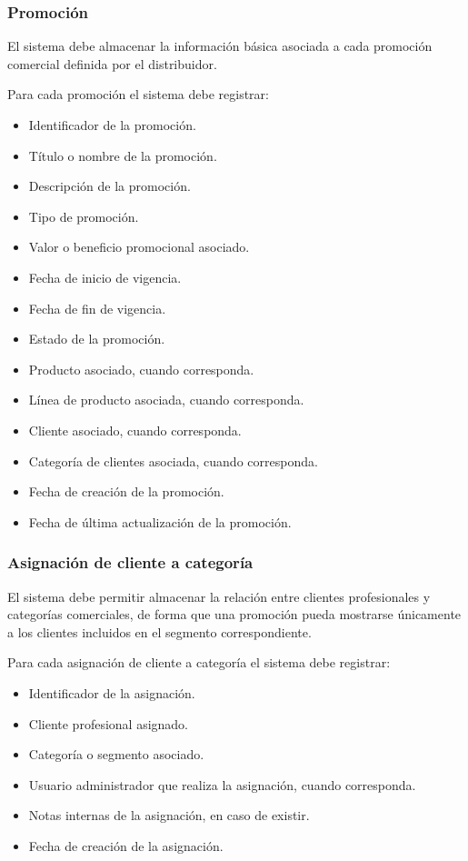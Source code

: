 \subsubsection*{Promoción}

El sistema debe almacenar la información básica asociada a cada promoción comercial definida por el distribuidor.

Para cada promoción el sistema debe registrar:

\begin{itemize}
    \item Identificador de la promoción.
    \item Título o nombre de la promoción.
    \item Descripción de la promoción.
    \item Tipo de promoción.
    \item Valor o beneficio promocional asociado.
    \item Fecha de inicio de vigencia.
    \item Fecha de fin de vigencia.
    \item Estado de la promoción.
    \item Producto asociado, cuando corresponda.
    \item Línea de producto asociada, cuando corresponda.
    \item Cliente asociado, cuando corresponda.
    \item Categoría de clientes asociada, cuando corresponda.
    \item Fecha de creación de la promoción.
    \item Fecha de última actualización de la promoción.
\end{itemize}

\subsubsection*{Asignación de cliente a categoría}

El sistema debe permitir almacenar la relación entre clientes profesionales y categorías comerciales, de forma que una promoción pueda mostrarse únicamente a los clientes incluidos en el segmento correspondiente.

Para cada asignación de cliente a categoría el sistema debe registrar:

\begin{itemize}
    \item Identificador de la asignación.
    \item Cliente profesional asignado.
    \item Categoría o segmento asociado.
    \item Usuario administrador que realiza la asignación, cuando corresponda.
    \item Notas internas de la asignación, en caso de existir.
    \item Fecha de creación de la asignación.
\end{itemize}

